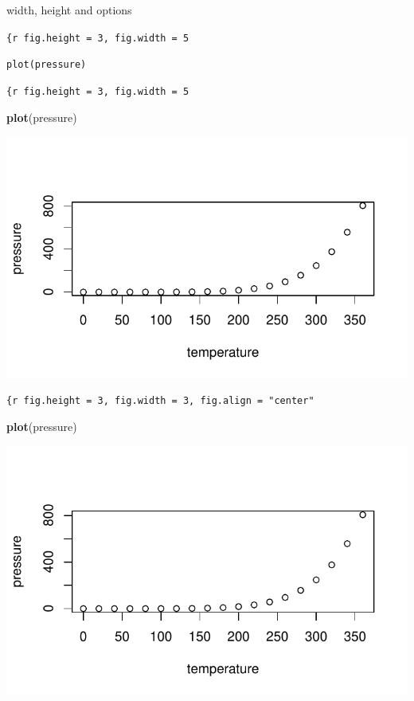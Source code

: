 \documentclass[
]{book}
\newenvironment{Shaded}{\begin{snugshade}}{\end{snugshade}}
\newcommand{\FunctionTok}[1]{\textcolor[rgb]{0.13,0.29,0.53}{\textbf{#1}}}
\newcommand{\NormalTok}[1]{#1}
\theoremstyle{definition}
\theoremstyle{definition}
\theoremstyle{definition}
\theoremstyle{definition}
\theoremstyle{remark}
\begin{document}
width, height and options

\texttt{\textasciigrave{}\textasciigrave{}\textasciigrave{}\{r\ fig.height\ =\ 3,\ fig.width\ =\ 5}

\texttt{plot(pressure)}

\texttt{\textasciigrave{}\textasciigrave{}\textasciigrave{}}

\texttt{\{r\ fig.height\ =\ 3,\ fig.width\ =\ 5}

\begin{Shaded}
\begin{Highlighting}[]
\FunctionTok{plot}\NormalTok{(pressure)}
\end{Highlighting}
\end{Shaded}

\includegraphics{202401280001-test_files/figure-latex/unnamed-chunk-7-1.pdf}

\texttt{\{r\ fig.height\ =\ 3,\ fig.width\ =\ 3,\ fig.align\ =\ "center"}

\begin{Shaded}
\begin{Highlighting}[]
\FunctionTok{plot}\NormalTok{(pressure)}
\end{Highlighting}
\end{Shaded}

\includegraphics{202401280001-test_files/figure-latex/unnamed-chunk-8-1.pdf}
\end{document}
